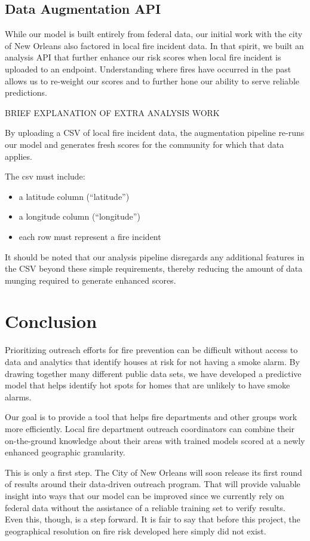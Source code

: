 \documentclass{sig-alternate}
\begin{document}
\subsection{Data Augmentation API}
While our model is built entirely from federal data, our initial work with the city of New Orleans also factored in local fire incident data. In that spirit, we built an analysis API that further enhance our risk scores when local fire incident is uploaded to an endpoint.  Understanding where fires have occurred in the past allows us to re-weight our scores and to further hone our ability to serve reliable predictions. 

BRIEF EXPLANATION OF EXTRA ANALYSIS WORK

By uploading a CSV of local fire incident data, the augmentation pipeline re-runs our model and generates fresh scores for the community for which that data applies.

The csv must include:
\begin{itemize}
\item a latitude column (``latitude'')
\item a longitude column (``longitude'')
\item each row must represent a fire incident
\end{itemize}

It should be noted that our analysis pipeline disregards any additional features in the CSV beyond these simple requirements, thereby reducing the amount of data munging required to generate enhanced scores.

\section{Conclusion}

Prioritizing outreach efforts for fire prevention can be difficult without access to data and analytics that identify houses at risk for not having a smoke alarm. By drawing together many different public data sets, we have developed a predictive model that helps identify hot spots for homes that are unlikely to have smoke alarms. 

Our goal is to provide a tool that helps fire departments and other groups work more efficiently. Local fire department outreach coordinators can combine their on-the-ground knowledge about their areas with trained models scored at a newly enhanced geographic granularity. 

This is only a first step. The City of New Orleans will soon release its first round of results around their data-driven outreach program. That will provide valuable insight into ways that our model can be improved since we currently rely on federal data without the assistance of a reliable training set to verify results. Even this, though, is a step forward. It is fair to say that before this project, the geographical resolution on fire risk developed here simply did not exist.
\end{document}
